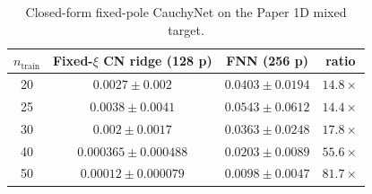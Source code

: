 \begin{table}[ht]
\centering
\small
\begin{tabular}{cccc}
\toprule
$n_{\mathrm{train}}$ & Fixed-$\xi$ CN ridge (128 p) & FNN (256 p) & ratio \\
\midrule
20 & \textbf{$0.0027 \pm 0.002$} & $0.0403 \pm 0.0194$ & $14.8\times$ \\
25 & \textbf{$0.0038 \pm 0.0041$} & $0.0543 \pm 0.0612$ & $14.4\times$ \\
30 & \textbf{$0.002 \pm 0.0017$} & $0.0363 \pm 0.0248$ & $17.8\times$ \\
40 & \textbf{$0.000365 \pm 0.000488$} & $0.0203 \pm 0.0089$ & $55.6\times$ \\
50 & \textbf{$0.00012 \pm 0.000079$} & $0.0098 \pm 0.0047$ & $81.7\times$ \\
\bottomrule
\end{tabular}
\caption{Closed-form fixed-pole CauchyNet on the Paper 1D mixed target.}
\label{tab:exp11_fixed_pole_ridge}
\end{table}

